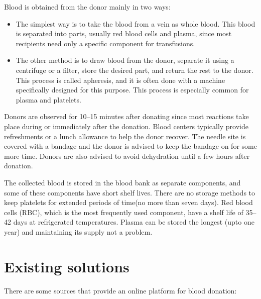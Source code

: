 \noindent
Blood is obtained from the donor mainly in two ways:
\begin{itemize}
\item The simplest way is to take the blood from a vein as whole blood. This blood is separated into parts, usually red blood cells and plasma, since most recipients need only a specific component for transfusions.
\item The other method is to draw blood from the donor, separate it using a centrifuge or a filter, store the desired part, and return the rest to the donor. This process is called apheresis, and it is often done with a machine specifically designed for this purpose. This process is especially common for plasma and platelets.
\end{itemize}

\noindent
Donors are observed for 10–15 minutes after donating since most reactions take place during or immediately after the donation. Blood centers typically provide refreshments or a lunch allowance to help the donor recover. The needle site is covered with a bandage and the donor is advised to keep the bandage on for some more time. Donors are also advised to avoid dehydration until a few hours after donation.

\noindent
The collected blood is stored in the blood bank as separate components, and some of these components have short shelf lives. There are no storage methods to keep platelets for extended periods of time(no more than seven days). Red blood cells (RBC), which is the most frequently used component, have a shelf life of 35–42 days at refrigerated temperatures. Plasma can be stored the longest (upto one year) and maintaining its supply not a problem.



\section{Existing solutions}
There are some sources that provide an online platform for blood donation:
